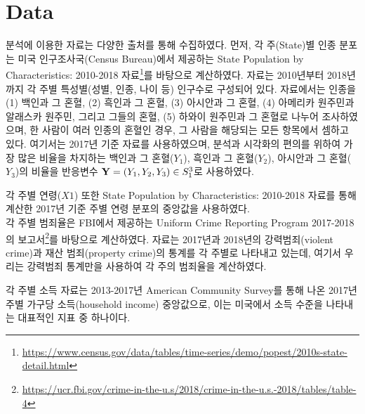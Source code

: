 \section{Data}
\label{sec:dat}


분석에 이용한 자료는 다양한 출처를 통해 수집하였다. 먼저, 각 주(State)별 인종 분포는 미국 인구조사국(Census Bureau)에서 제공하는 State Population by Characteristics: 2010-2018 자료\footnote{\url{https://www.census.gov/data/tables/time-series/demo/popest/2010s-state-detail.html}}를 바탕으로 계산하였다. 자료는 2010년부터 2018년까지 각 주별 특성별(성별, 인종, 나이 등) 인구수로 구성되어 있다. 자료에서는 인종을 (1) 백인과 그 혼혈, (2) 흑인과 그 혼혈, (3) 아시안과 그 혼혈, (4) 아메리카 원주민과 알래스카 원주민, 그리고 그들의 혼혈, (5) 하와이 원주민과 그 혼혈로 나누어 조사하였으며, 한 사람이 여러 인종의 혼혈인 경우, 그 사람을 해당되는 모든 항목에서 셈하고 있다. 여기서는 2017년 기준 자료를 사용하였으며, 분석과 시각화의 편의를 위하여 가장 많은 비율을 차지하는 백인과 그 혼혈($Y_1$), 흑인과 그 혼혈($Y_2$), 아시안과 그 혼혈($Y_3$)의 비율을 반응변수 $\mathbf{Y} = (Y_1, Y_2,Y_3) \in S_1^3$로 사용하였다.

각 주별 연령($X1$) 또한 State Population by Characteristics: 2010-2018 자료를 통해 계산한 2017년 기준 주별 연령 분포의 중앙값을 사용하였다.
\\
각 주별 범죄율은 FBI에서 제공하는 Uniform Crime Reporting Program 2017-2018의 보고서\footnote{\url{https://ucr.fbi.gov/crime-in-the-u.s/2018/crime-in-the-u.s.-2018/tables/table-4}}를 바탕으로 계산하였다. 자료는 2017년과 2018년의 강력범죄(violent crime)과 재산 범죄(property crime)의 통계를 각 주별로 나타내고 있는데, 여기서 우리는 강력범죄 통계만을 사용하여 각 주의 범죄율을 계산하였다.

각 주별 소득 자료는 2013-2017년 American Community Survey를 통해 나온 2017년 주별 가구당 소득(household income) 중앙값으로, 이는 미국에서 소득 수준을 나타내는 대표적인 지표 중 하나이다.


